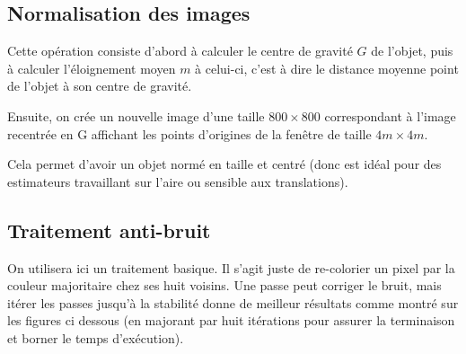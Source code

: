 \documentclass{article}
\theoremstyle{definition}
\begin{document}
    \subsection{Normalisation des images}  
    
    Cette opération consiste d'abord à calculer le centre de gravité $G$ de l'objet, puis à calculer l'éloignement moyen $m$ à celui-ci, c'est à dire le distance moyenne point de l'objet à son centre de gravité.
    
    Ensuite, on crée un nouvelle image d'une taille $800 \times 800$ correspondant à l'image recentrée en G affichant les points d'origines de la fenêtre de taille $4m \times 4m$.
    
    Cela permet d'avoir un objet normé en taille et centré (donc est idéal pour des estimateurs travaillant sur l'aire ou sensible aux translations).
      
    \subsection{Traitement anti-bruit}
    \label{sec:anti-bruit}
    
    On utilisera ici un traitement basique. Il s'agit juste de re-colorier un pixel par la couleur majoritaire chez ses huit voisins. Une passe peut corriger le bruit, mais itérer les passes jusqu'à la stabilité donne de meilleur résultats comme montré sur les figures ci dessous (en majorant par huit itérations pour assurer la terminaison et borner le temps d'exécution).
    
\end{document}
